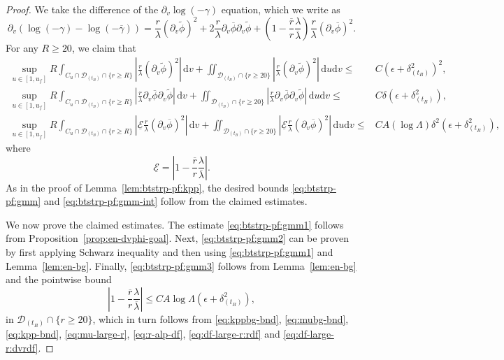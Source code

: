 \documentclass[10pt, reqno]{amsart}
\theoremstyle{definition}
\theoremstyle{remark}
\theoremstyle{conjecture}
\numberwithin{equation}{section}
\newcommand{\set}[1]{\{#1\}}
\newcommand{\ud}{\mathrm{d}}
\newcommand{\rd}{\partial}
\newcommand{\0}{\emptyset}
\newcommand{\gmm}{\gamma}
\newcommand{\dlt}{\delta}
\newcommand{\eps}{\epsilon}
\newcommand{\lmb}{\lambda}
\newcommand{\Lmb}{\Lambda}
\newcommand{\calD}{\mathcal D}
\newcommand{\calE}{\mathcal E}
\newcommand{\dur}{\nu}
\newcommand{\dvr}{\lmb}
\newcommand{\phibg}{\overline{\phi}}				%
\newcommand{\dvrbg}{\overline{\dvr}}				%
\newcommand{\rbg}{\overline{r}}					%
\newcommand{\gmmbg}{\overline{\gmm}}					%
\newcommand{\phidf}{\widetilde{\phi}}				%
\newcommand{\Abs}[1]{\left\vert #1 \right\vert}
\begin{document}
\begin{proof}
We take the difference of the $\rd_{v} \log (-\gmm)$ equation, which we write as
\begin{equation*}
	\rd_{v} (\log (-\gmm) - \log (-\gmmbg)) 
	= \frac{r}{\dvr} (\rd_{v} \phidf)^{2} + 2 \frac{r}{\dvr} \rd_{v} \phibg \rd_{v} \phidf + \left(1 - \frac{\rbg}{r} \frac{\dvr}{\dvrbg} \right) \frac{r}{\dvr} (\rd_{v} \phibg)^{2}.
\end{equation*}
For any $R \geq 20$, we claim that
\begin{align}
	\sup_{u \in [1, u_{f}]} R \int_{C_{u} \cap \calD_{(t_{B})} \cap \set{r \geq R}} \Abs{\frac{r}{\dvr} (\rd_{v} \phidf)^{2}}  \, \ud v
	+ \iint_{\calD_{(t_{B})} \cap \set{r \geq 20}} \Abs{\frac{r}{\dvr} (\rd_{v} \phidf)^{2} } \, \ud u \ud v
	\leq & C \left( \eps + \dlt_{(t_{B})}^{2} \right)^{2} ,	 \label{eq:btstrp-pf:gmm1}\\
	\sup_{u \in [1, u_{f}]} R \int_{C_{u} \cap \calD_{(t_{B})} \cap \set{r \geq R}} \Abs{\frac{r}{\dvr} \rd_{v} \phibg \rd_{v} \phidf}  \, \ud v
	+ \iint_{\calD_{(t_{B})} \cap \set{r \geq 20}} \Abs{\frac{r}{\dvr} \rd_{v} \phibg \rd_{v} \phidf } \, \ud u \ud v
	\leq & C \dlt \left( \eps + \dlt_{(t_{B})}^{2} \right) ,		 \label{eq:btstrp-pf:gmm2} \\
	\sup_{u \in [1, u_{f}]} R \int_{C_{u} \cap \calD_{(t_{B})} \cap \set{r \geq R}} 
					\Abs{\underline{\calE} \frac{r}{\dvr}(\rd_{v} \phibg)^{2}} \, \ud v
	+ \iint_{\calD_{(t_{B})} \cap \set{r \geq 20}} 
					\Abs{\underline{\calE} \frac{r}{\dvr}(\rd_{v} \phibg)^{2}} \, \ud u \ud v
	\leq & C A (\log \Lmb) \dlt^{2} \left( \eps + \dlt_{(t_{B})}^{2} \right), \label{eq:btstrp-pf:gmm3}
\end{align}
where
\begin{equation*}
	\underline{\calE} = \Abs{1 - \frac{\rbg}{r} \frac{\dvr}{\dvrbg}}.
\end{equation*}
As in the proof of Lemma~\ref{lem:btstrp-pf:kpp}, the desired bounds \eqref{eq:btstrp-pf:gmm} and \eqref{eq:btstrp-pf:gmm-int} follow from the claimed estimates. 

We now prove the claimed estimates. The estimate \eqref{eq:btstrp-pf:gmm1} follows from Proposition~\ref{prop:en-dvphi-goal}. Next, \eqref{eq:btstrp-pf:gmm2} can be proven by first applying Schwarz inequality and then using \eqref{eq:btstrp-pf:gmm1} and Lemma~\ref{lem:en-bg}. Finally, \eqref{eq:btstrp-pf:gmm3} follows from Lemma~\ref{lem:en-bg} and the pointwise bound
\begin{equation*}
	\Abs{1 - \frac{\rbg}{r} \frac{\dvr}{\dvrbg}}
	\leq  C A \log \Lmb \left( \eps + \dlt_{(t_{B})}^{2} \right),
\end{equation*}
in $\calD_{(t_{B})} \cap \set{r \geq 20}$, which in turn follows from \eqref{eq:kppbg-bnd}, \eqref{eq:mubg-bnd}, \eqref{eq:kpp-bnd}, \eqref{eq:mu-large-r}, \eqref{eq:r-alp-df}, \eqref{eq:df-large-r:rdf} and \eqref{eq:df-large-r:dvrdf}. \qedhere
\end{proof}
\end{document}
